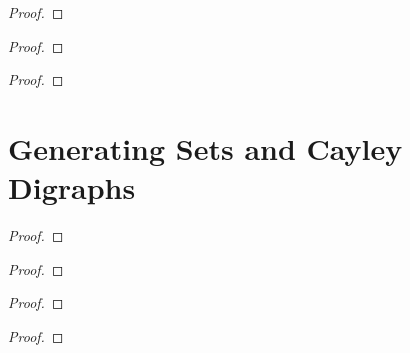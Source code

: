 \begin{exercise}
\end{exercise}

\begin{proof}
\end{proof}

\begin{exercise}
\end{exercise}

\begin{proof}
\end{proof}

\begin{exercise}
\end{exercise}

\begin{proof}
\end{proof}

\section{Generating Sets and Cayley Digraphs}

\begin{exercise}
\end{exercise}

\begin{proof}
\end{proof}

\begin{exercise}
\end{exercise}

\begin{proof}
\end{proof}

\begin{exercise}
\end{exercise}

\begin{proof}
\end{proof}

\begin{exercise}
\end{exercise}

\begin{proof}
\end{proof}

\begin{exercise}
\end{exercise}

